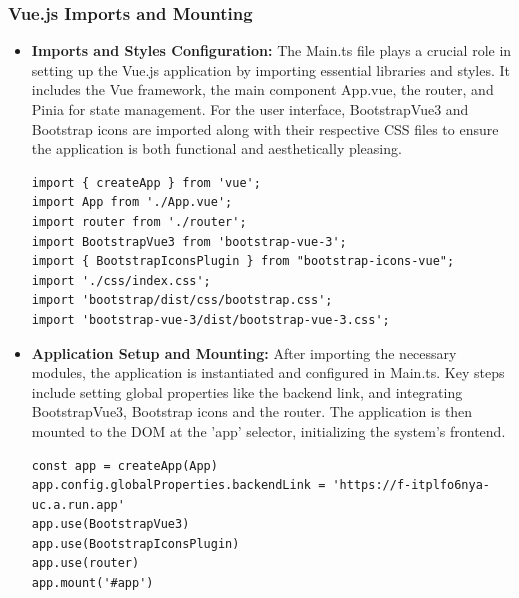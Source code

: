\subsubsection{Vue.js Imports and Mounting}
\begin{itemize}
    \item \textbf{Imports and Styles Configuration:} The Main.ts file plays a crucial role in setting up the Vue.js application by importing essential libraries and styles. It includes the Vue framework, the main component App.vue, the router, and Pinia for state management. For the user interface, BootstrapVue3 and Bootstrap icons are imported along with their respective CSS files to ensure the application is both functional and aesthetically pleasing.
    \begin{lstlisting}
import { createApp } from 'vue';
import App from './App.vue';
import router from './router';
import BootstrapVue3 from 'bootstrap-vue-3';
import { BootstrapIconsPlugin } from "bootstrap-icons-vue";
import './css/index.css';
import 'bootstrap/dist/css/bootstrap.css';
import 'bootstrap-vue-3/dist/bootstrap-vue-3.css';
    \end{lstlisting}

    \item \textbf{Application Setup and Mounting:} After importing the necessary modules, the application is instantiated and configured in Main.ts. Key steps include setting global properties like the backend link, and integrating BootstrapVue3, Bootstrap icons and the router. The application is then mounted to the DOM at the 'app' selector, initializing the system's frontend.
    \begin{lstlisting}
const app = createApp(App)
app.config.globalProperties.backendLink = 'https://f-itplfo6nya-uc.a.run.app'
app.use(BootstrapVue3)
app.use(BootstrapIconsPlugin)
app.use(router)
app.mount('#app')
    \end{lstlisting}
\end{itemize}
